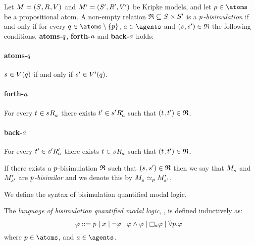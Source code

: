\begin{definition}
Let $\kModelAndTuple$ and $\kModelAndTupleP$ be Kripke models, and let $\atomP \in \atoms$ be a propositional atom.
A non-empty relation $\bisimulation \subseteq \kStates \times \kStatesP$ is a {\em $p$-bisimulation} if and only if for every $\atomQ \in \atoms \setminus \{\atomP\}$, $\agentA \in \agents$ and $(\kStateS, \kStateSP) \in \bisimulation$ the following conditions, {\bf atoms-$q$}, {\bf forth-$a$} and {\bf back-$a$} holds:

\paragraph{atoms-$q$}
$\kStateS \in \kValuation(\atomQ)$ if and only if ${s}^{\prime} \in {V^{\prime}}(q)$.

\paragraph{forth-$a$}
For every $\kStateT \in \kSuccessorsA{\kStateS}$ there exists ${t}^{\prime} \in {{s}^{\prime}} {R^{\prime}_{a}}$ such that $(\kStateT, \kStateTP) \in \bisimulation$.

\paragraph{back-$a$}
For every ${t}^{\prime} \in {{s}^{\prime}} {R^{\prime}_{a}}$ there exists $\kStateT \in \kSuccessorsA{\kStateS}$ such that $(\kStateT, \kStateTP) \in \bisimulation$.

If there exists a $p$-bisimulation $\mathfrak{R}$ such that $(\kStateS, \kStateSP) \in \bisimulation$ then we say that $\kPModel{\kStateS}$ and ${M^{\prime}_{{s}^{\prime}}}$ are {\em $p$-bisimilar} and we denote this by $\kPModel{\kStateS} \bisimilar[\atomP] \kPModelP{\kStateSP}$.
\end{definition}

We define the syntax of bisimulation quantified modal logic.

\begin{definition}
The {\em language of bisimulation quantified modal logic}, \langBqml{}, is defined inductively as:
$$
\phi ::= 
    \atomP \mid
    \varX \mid
    \lnot \phi \mid
    \phi \land \phi \mid
    \necessaryA \phi \mid
    \allbisimsP \phi
$$
where $\atomP \in \atoms$, and $\agentA \in \agents$.
\end{definition}

